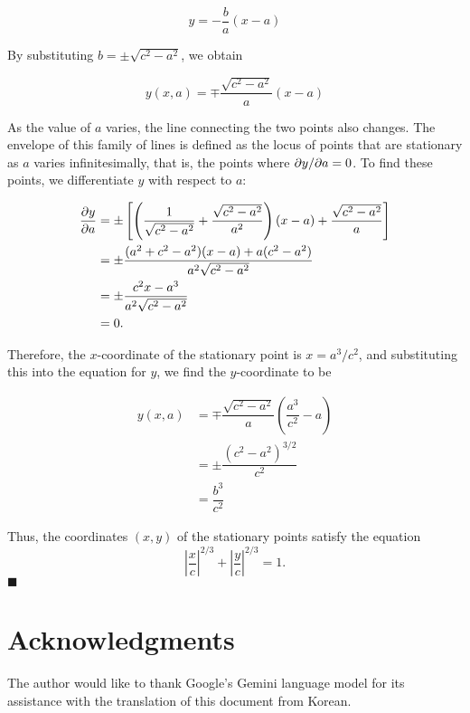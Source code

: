 \documentclass[twocolumn]{article}
\begin{document}
$$y=-\dfrac{b}{a}(x-a)$$

By substituting $b=\pm \sqrt{c^2-a^2}$, we obtain

$$y(x, a) = \mp \dfrac{\sqrt{c^2-a^2}}{a}(x-a)$$

As the value of $a$ varies, the line connecting the two points also changes. The envelope of this family of lines is defined as the locus of points that are stationary as $a$ varies infinitesimally, that is, the points where ${{\partial y}/{\partial a}} = 0$. To find these points, we differentiate $y$ with respect to $a$:

$$ \begin{aligned}
	{\frac{\partial y}{\partial a}} &= \pm\left[\left( \dfrac{1}{\sqrt{c^2-a^2}}+\dfrac{\sqrt{c^2-a^2}}{a^2}\right) (x-a) + \dfrac{\sqrt{c^2-a^2}}{a} \right]\\
	&= \pm \dfrac{(a^2+c^2-a^2)(x-a)+a(c^2-a^2)}{a^2\sqrt{c^2-a^2}}\\
	&= \pm \dfrac{c^2 x - a^3}{a^2 \sqrt{c^2 - a^2}}\\
	&= 0.
\end{aligned}
$$

Therefore, the $x$-coordinate of the stationary point is $x = a^3/c^2$, and substituting this into the equation for $y$, we find the $y$-coordinate to be

$$ \begin{aligned}
	y(x, a) &= \mp \dfrac{\sqrt{c^2-a^2}}{a}\left(\dfrac{a^3}{c^2}-a\right)\\
	& = \pm \dfrac{\left( c^2- a^2 \right)^{3/2}}{c^2}\\
	& = \dfrac{b^3}{c^2}
\end{aligned}
$$

Thus, the coordinates $(x, y)$ of the stationary points satisfy the equation
$$ \left|\dfrac{x}{c}\right|^{2/3} + \left|\dfrac{y}{c}\right|^{2/3} = 1. $$
$\blacksquare$

\section*{Acknowledgments}
The author would like to thank Google's Gemini language model for its assistance with the translation of this document from Korean.
\end{document}
